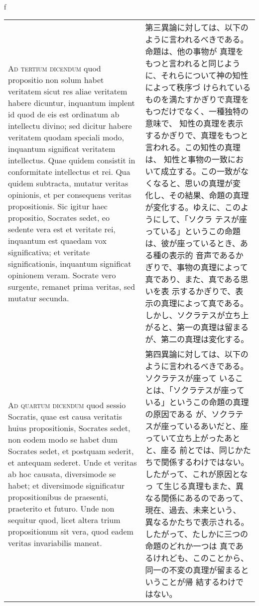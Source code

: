 \\f\documentclass[10pt]{jsarticle} %
\begin{document}
\begin{longtable}{p{21em}p{21em}}
\\


{\scshape Ad tertium dicendum} quod propositio non solum habet
veritatem sicut res aliae veritatem habere dicuntur, inquantum implent
id quod de eis est ordinatum ab intellectu divino; sed dicitur habere
veritatem quodam speciali modo, inquantum significat veritatem
intellectus. Quae quidem consistit in conformitate intellectus et
rei. Qua quidem subtracta, mutatur veritas opinionis, et per
consequens veritas propositionis. Sic igitur haec propositio, Socrates
sedet, eo sedente vera est et veritate rei, inquantum est quaedam vox
significativa; et veritate significationis, inquantum significat
opinionem veram. Socrate vero surgente, remanet prima veritas, sed
mutatur secunda.

&

第三異論に対しては、以下のように言われるべきである。命題は、他の事物が
真理をもつと言われると同じように、それらについて神の知性によって秩序づ
けられているものを満たすかぎりで真理をもつだけでなく、一種独特の意味で、
知性の真理を表示するかぎりで、真理をもつと言われる。この知性の真理は、
知性と事物の一致において成立する。この一致がなくなると、思いの真理が変
化し、その結果、命題の真理が変化する。ゆえに、このようにして、「ソクラ
テスが座っている」というこの命題は、彼が座っているとき、ある種の表示的
音声であるかぎりで、事物の真理によって真であり、また、真である思いを表
示するかぎりで、表示の真理によって真である。しかし、ソクラテスが立ち上
がると、第一の真理は留まるが、第二の真理は変化する。

\\


{\scshape Ad quartum dicendum} quod sessio Socratis, quae est causa
veritatis huius propositionis, Socrates sedet, non eodem modo se habet
dum Socrates sedet, et postquam sederit, et antequam sederet. Unde et
veritas ab hoc causata, diversimode se habet; et diversimode
significatur propositionibus de praesenti, praeterito et futuro. Unde
non sequitur quod, licet altera trium propositionum sit vera, quod
eadem veritas invariabilis maneat.

&

第四異論に対しては、以下のように言われるべきである。ソクラテスが座って
いることは、「ソクラテスが座っている」というこの命題の真理の原因である
が、ソクラテスが座っているあいだと、座っていて立ち上がったあとと、座る
前とでは、同じかたちで関係するわけではない。したがって、これが原因となっ
て生じる真理もまた、異なる関係にあるのであって、現在、過去、未来という、
異なるかたちで表示される。したがって、たしかに三つの命題のどれか一つは
真であるけれども、このことから、同一の不変の真理が留まるということが帰
結するわけではない。
\end{longtable}
\end{document}
